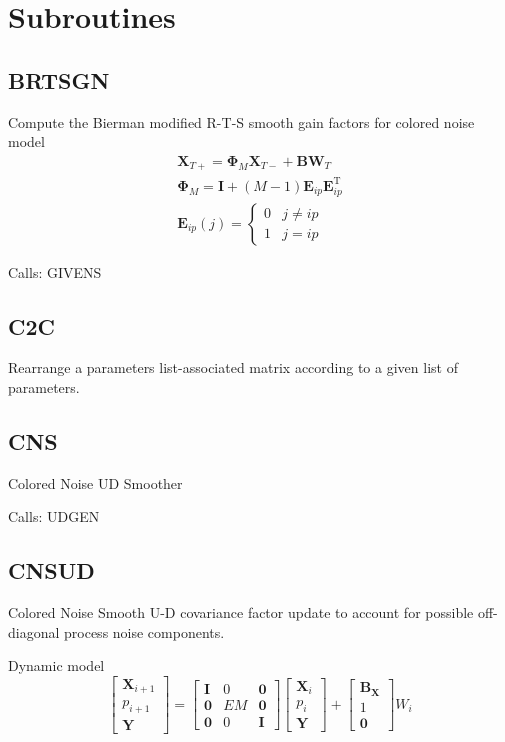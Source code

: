 \documentclass[./doc.tex]{subfiles}
\begin{document}
\section{Subroutines}

\subsection{BRTSGN}
Compute the Bierman modified R-T-S smooth gain factors for colored noise model
\begin{gather}
    \bm{X}_{T+}=\bm{\Phi}_M \bm{X}_{T-} + \bm{BW}_{T} \\
    \bm{\Phi}_M=\bm{I} + (M-1)\bm{E}_{ip}\bm{E}_{ip}^{\textrm{T}} \\
    \bm{E}_{ip}(j)=\begin{cases}
        0 & j \ne ip \\
        1 & j = ip
    \end{cases}
\end{gather}

Calls: GIVENS

\subsection{C2C}
Rearrange a parameters list-associated matrix according to a given list of parameters.

\subsection{CNS}
Colored Noise UD Smoother

Calls: UDGEN

\subsection{CNSUD}
Colored Noise Smooth U-D covariance factor update to account for possible off-diagonal
process noise components.

Dynamic model
\begin{equation}
    \begin{bmatrix}
        \bm{X}_{i+1} \\
        p_{i+1}      \\
        \bm{Y}
    \end{bmatrix} =
    \begin{bmatrix}
        \bm{I} & 0  & \bm{0} \\
        \bm{0} & EM & \bm{0} \\
        \bm{0} & 0  & \bm{I}
    \end{bmatrix}
    \begin{bmatrix}
        \bm{X}_{i} \\
        p_{i}      \\
        \bm{Y}
    \end{bmatrix} +
    \begin{bmatrix}
        \bm{B}_{\bm{X}} \\
        1               \\
        \bm{0}
    \end{bmatrix} W_i
\end{equation}
\end{document}
